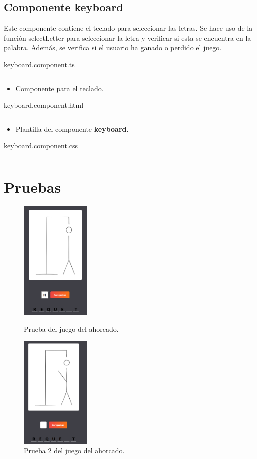 \documentclass{article}
\newenvironment{block}{\captionsetup{type=listing}}{}
\begin{document}
\subsection{Componente keyboard}
Este componente contiene el teclado para seleccionar las letras. Se hace uso de la función selectLetter para seleccionar la letra y verificar si esta se encuentra en la palabra. Además, se verifica si el usuario ha ganado o perdido el juego.
\begin{block}
	\caption{keyboard.component.ts}
	\inputminted{TypeScript}{../hangMan/src/app/keyboard/keyboard.component.ts}
	\begin{itemize}
		\item Componente para el teclado.
	\end{itemize}

	\caption{keyboard.component.html}
	\inputminted{HTML}{../hangMan/src/app/keyboard/keyboard.component.html}
	\begin{itemize}
		\item Plantilla del componente \textbf{keyboard}.
	\end{itemize}

	\caption{keyboard.component.css}
	\inputminted{CSS}{../hangMan/src/app/keyboard/keyboard.component.css}
\end{block}

\section{Pruebas}
\begin{figure}[H]
	\centering
	\includegraphics[width=0.3\textwidth,keepaspectratio]{img/prueba.png}
	\caption{Prueba del juego del ahorcado.}
	\centering
	\includegraphics[width=0.3\textwidth,keepaspectratio]{img/prueba2.png}
	\caption{Prueba 2 del juego del ahorcado.}
\end{figure}
\pagebreak
\end{document}
